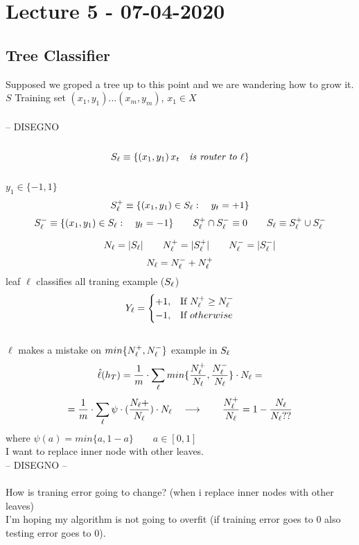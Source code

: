 \documentclass[../main.tex]{subfiles}
\begin{document}
\chapter{Lecture 5 - 07-04-2020}

\section{Tree Classifier}

Supposed we groped a tree up to this point and we are wandering how to
grow it.
\\
$S$ Training set $(x_1,y_1)...(x_m,y_m)$, $x_1 \in X$
\\\\
-- DISEGNO
\\\\
$$
S_{\ell} \equiv \{(x_1,y_1) \, x_t \quad \textit{is router to } \ell \}
$$
\\
$y_1 \in \{-1,1\}$
\\
$$
S_{\ell} ^+ \equiv \{(x_1,y_1) \in S_{\ell} : \quad y_t = +1 \} 
$$
$$
S_{\ell}^- \equiv \{(x_1,y_1) \in S_{\ell} : \quad  y_t = -1 \} 
\qquad
S_{\ell}^+ \cap S_{\ell}^- \equiv 0 \qquad S_{\ell} \equiv S_{\ell}^+ \cup S_{\ell}^-
$$

$$
\qquad N_{\ell} = | S_{\ell}| 
\qquad N_{\ell}^+ = |S_{\ell}^+| 
\qquad  N_{\ell}^- = |S_{\ell}^-| $$
$$
N_{\ell} = N_{\ell}^- + N_{\ell}^+
$$
leaf $\ell$ classifies all traning example ($S_{\ell}$)
\\
$$
Y_{\ell} = 
\begin{cases}
+1, & \mbox{If } N_{\ell}^+ \geq N_{\ell}^- 
\\
-1, & \mbox{If } otherwise
\end{cases}
$$
\\
$\ell$ makes a mistake on $min \{N_{\ell}^+, N_{\ell}^- \}$ example in $S_{\ell}$
$$
\hat{\ell}(h_T) = \frac{1}{m} 
\cdot \sum_{\ell}{} min \{ \frac{N_{\ell}^+}{N_{\ell}} , \frac{N_{\ell}^-}{N_{\ell}} \} \cdot N_{\ell} =
$$
$$
= \frac{1}{m} \cdot \sum_{\ell}{}\psi \cdot (\frac{N_{\ell}+}{N_{\ell}}) \cdot N_{\ell} \quad \longrightarrow  \qquad \frac{N_{\ell}^+}{N_{\ell}} = 1 - \frac{N_{\ell}}{N_{\ell} ??}
$$
where $\psi(a) = min \{a, 1-a \} \qquad a \in [0,1] $
\\
I want to replace inner node with other leaves.
\\
-- DISEGNO --
\\\\
How is traning error going to change?
(when i replace inner nodes with other leaves)
\\
I’m hoping my algorithm is not going to overfit (if training error goes to 0 also
testing error goes to 0).\\
\end{document}
